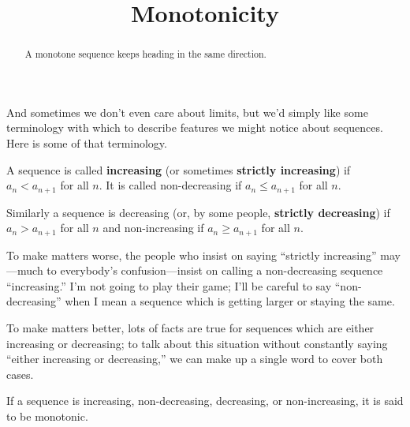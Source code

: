\documentclass{ximera}
\title{Monotonicity}
\newcommand{\defnword}[1]{\textbf{#1}}
\newcommand{\ds}{\displaystyle}
\renewcommand{\index}[1]{}
\begin{document}
\begin{abstract}
  A monotone sequence keeps heading in the same direction.
\end{abstract}

\maketitle

\label{subsection:monotonicity}

And sometimes we don't even care about limits, but we'd simply like
some terminology with which to describe features we might notice about
sequences.  Here is some of that terminology.


\begin{definition}
  A sequence is called
  \defnword{increasing}\index{sequence!increasing} (or sometimes
  \defnword{strictly increasing}) if $\ds a_n<a_{n+1}$ for all $n$.
  It is called {\dfont
    non-decreasing\index{sequence!non-decreasing}\/} if $\ds a_n\le
  a_{n+1}$ for all $n$.

  Similarly a sequence is {\dfont
    decreasing\index{sequence!decreasing}\/} (or, by some people,
  \defnword{strictly decreasing}) if $\ds a_n>a_{n+1}$ for all $n$ and
  {\dfont non-increasing\index{sequence!non-increasing}\/} if $\ds
  a_n\ge a_{n+1}$ for all $n$.
\end{definition}
To make matters worse, the people who insist on saying ``strictly
increasing'' may---much to everybody's confusion---insist on calling a
non-decreasing sequence ``increasing.'' I'm not going to play their
game; I'll be careful to say ``non-decreasing'' when I mean a sequence
which is getting larger or staying the same.

To make matters better, lots of facts are true for sequences which are
either increasing or decreasing; to talk about this situation without
constantly saying ``either increasing or decreasing,'' we can make up
a single word to cover both cases.
\begin{definition}
  If a sequence is increasing, non-decreasing, decreasing, or
  non-increasing, it is said to be {\dfont
    monotonic\index{sequence!monotonic}\/}.
\end{definition}

\end{document}
